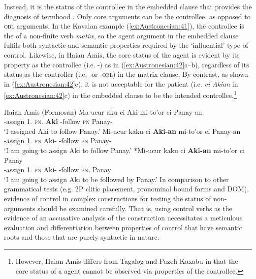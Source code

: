 \documentclass[output=paper,chinesefont]{../langscibook}
\begin{document}
Instead, it is the status of the controllee in the embedded clause that provides the diagnosis of termhood \citep[40]{Kroeger93}. Only core arguments can be the controllee, as opposed to \textsc{obl} arguments. In the Kavalan example (\ref{ex:Austronesian:41}), the controllee is the \SUBJ of a non-finite \AV verb \emph{matiw}, so the agent argument in the embedded clause fulfils both syntactic and semantic properties required by the `influential' type of control. Likewise, in Haian Amis, the core status of the \AV agent is evident by its property as the controllee (i.e. \AV-\SUBJ) as in (\ref{ex:Austronesian:42}a--b), regardless of its status as the controller (i.e. \PV-\SUBJ or \AV-\textsc{obl}) in the matrix clause. By contrast, as shown in (\ref{ex:Austronesian:42}c), it is not acceptable for the \AV patient (i.e. \emph{ci Akian} in \ref{ex:Austronesian:42}c) in the embedded clause to be the intended controllee.\footnote{However, Haian Amis differs from Tagalog \citep{Kroeger93} and Pazeh-Kaxabu \citep{Yeh:PhD} in that the core status of a \PV agent cannot be observed via properties of the controllee.}

\ea\label{ex:Austronesian:42} Haian Amis (Formosan) \citep[378--379]{Wu2006}
\ea\gll
Ma-ucur aku ci    Aki  mi-to'or ci Panay-an.\\
  \PV-assign {1\SG.\GEN} \textsc{pn}.{\ABS} \textbf{Aki}  \AV-follow \textsc{pn} Panay-{\LOC}\\
\glt `I assigned Aki to follow Panay.'
\ex\gll
Mi-ucur kaku     ci \textbf{Aki-an} mi-to'or ci Panay-an\\
\AV-assign {1\SG}.{\ABS}   \textsc{pn} Aki-{\LOC} \AV-follow \textsc{pn} Panay-{\LOC}\\
\glt`I am going to assign Aki to follow Panay.'
\ex\gll
 *Mi-ucur kaku     ci \textbf{Aki-an} mi-to'or ci Panay\\
\AV-assign {1\SG}.{\ABS}   \textsc{pn} Aki-{\LOC} \AV-follow \textsc{pn}.{\ABS} Panay\\
\glt`I am going to assign Aki to be followed by Panay.'
\z\z
In comparison to other grammatical tests (e.g. 2P clitic placement, pronominal bound forms and DOM), evidence of control in complex constructions for testing the status of non-\SUBJ arguments should be examined carefully. That is, using control verbs as the evidence of an accusative analysis of the \AV construction necessitates a meticulous evaluation and differentiation between properties of control that have semantic roots and those that are purely syntactic in nature.
\end{document}
